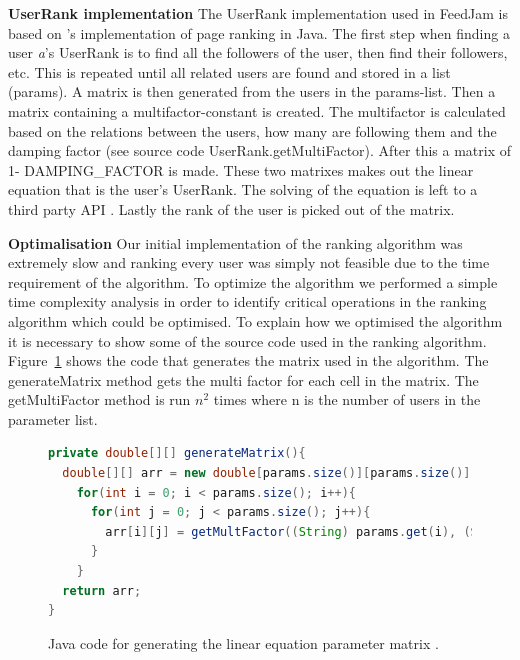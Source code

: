 {\bf UserRank implementation}\newline
The UserRank implementation used in FeedJam is based on \citet{Goodrarzi2009}'s implementation of page ranking in Java. The first step when finding a user \emph{a}'s UserRank is to find all the followers of the user, then find their followers, etc. This is repeated until all related users are found and stored in a list (params). A matrix is then generated from the users in the params-list. Then a matrix containing a multifactor-constant is created. The multifactor is calculated based on the relations between the users, how many are following them and the damping factor (see source code UserRank.getMultiFactor). After this a matrix of 1- DAMPING\_FACTOR is made. These two matrixes makes out the linear equation that is the user's UserRank. The solving of the equation is left to a third party API \citep{Jama}. Lastly the rank of the user is picked out of the matrix.

 
{\bf Optimalisation} \newline
Our initial implementation of the ranking algorithm was extremely slow and ranking every user was simply not feasible due to the time requirement of the algorithm. To optimize the algorithm we performed a  simple time complexity analysis in order to identify critical operations in the ranking algorithm which could be optimised. To explain how we optimised the algorithm it is necessary to show some of the source code used in the ranking algorithm. Figure~\ref{fig:generateMatrix} shows the code that generates the matrix used in the algorithm. The generateMatrix method gets the multi factor for each cell in the matrix. The getMultiFactor method is run \(n^2\) times where n is the number of users in the parameter list.

\begin{figure}[h!]
\begin{lstlisting}[language=java]
private double[][] generateMatrix(){ 
  double[][] arr = new double[params.size()][params.size()]; 
    for(int i = 0; i < params.size(); i++){ 
      for(int j = 0; j < params.size(); j++){ 
        arr[i][j] = getMultFactor((String) params.get(i), (String) params.get(j));
      }
    } 
  return arr;
}
\end{lstlisting}
\caption{Java code for generating the linear equation parameter matrix \protect \cite{Goodrarzi2009}.}
\label{fig:generateMatrix}
\end{figure}

